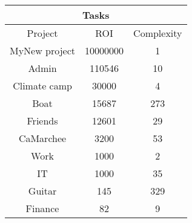 \begin{longtable}{|c|c|c|}
\hline
\multicolumn{3}{|c|}{Tasks} \\
\hline
Project & ROI & Complexity \\
\hline
MyNew project & 10000000 & 1\\
\hline
Admin & 110546 & 10\\
\hline
Climate camp & 30000 & 4\\
\hline
Boat & 15687 & 273\\
\hline
Friends & 12601 & 29\\
\hline
CaMarchee & 3200 & 53\\
\hline
Work & 1000 & 2\\
\hline
IT & 1000 & 35\\
\hline
Guitar & 145 & 329\\
\hline
Finance & 82 & 9\\
\hline
\end{longtable}
